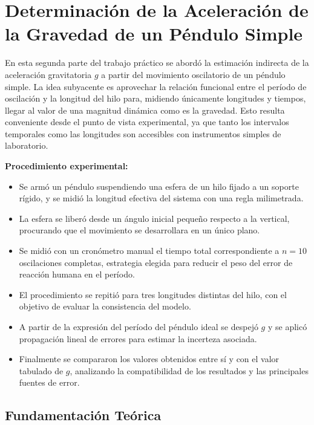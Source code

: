 \section{Determinación de la Aceleración de la Gravedad de un Péndulo Simple}

En esta segunda parte del trabajo práctico se abordó la estimación indirecta de la aceleración gravitatoria $g$ a partir del movimiento oscilatorio de un péndulo simple. La idea subyacente es aprovechar la relación funcional entre el período de oscilación y la longitud del hilo para, midiendo únicamente longitudes y tiempos, llegar al valor de una magnitud dinámica como es la gravedad. Esto resulta conveniente desde el punto de vista experimental, ya que tanto los intervalos temporales como las longitudes son accesibles con instrumentos simples de laboratorio.

\textbf{Procedimiento experimental:}
\begin{itemize}
    \item Se armó un péndulo suspendiendo una esfera de un hilo fijado a un soporte rígido, y se midió la longitud efectiva del sistema con una regla milimetrada.

    \item La esfera se liberó desde un ángulo inicial pequeño respecto a la vertical, procurando que el movimiento se desarrollara en un único plano.

    \item Se midió con un cronómetro manual el tiempo total correspondiente a $n = 10$ oscilaciones completas, estrategia elegida para reducir el peso del error de reacción humana en el período.

    \item El procedimiento se repitió para tres longitudes distintas del hilo, con el objetivo de evaluar la consistencia del modelo.

    \item A partir de la expresión del período del péndulo ideal se despejó $g$ y se aplicó propagación lineal de errores para estimar la incerteza asociada.

    \item Finalmente se compararon los valores obtenidos entre sí y con el valor tabulado de $g$, analizando la compatibilidad de los resultados y las principales fuentes de error.
\end{itemize}

\pagebreak

\subsection{Fundamentación Teórica}

